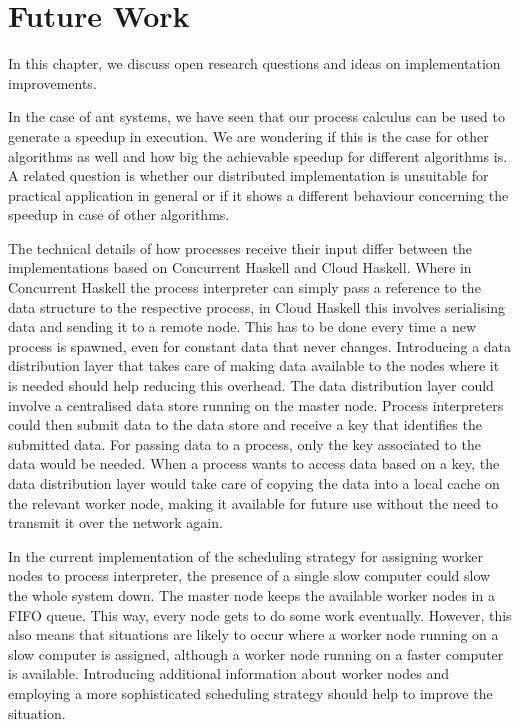 \chapter{Future Work}
In this chapter, we discuss open research questions and ideas on implementation improvements.

In the case of ant systems, we have seen that our process calculus can be used to generate a speedup in execution. We are wondering if this is the case for other algorithms as well and how big the achievable speedup for different algorithms is. A related question is whether our distributed implementation is unsuitable for practical application in general or if it shows a different behaviour concerning the speedup in case of other algorithms.

The technical details of how processes receive their input differ between the implementations based on \textsf{Concurrent Haskell} and \textsf{Cloud Haskell}. Where in \textsf{Concurrent Haskell} the process interpreter can simply pass a reference to the data structure to the respective process, in \textsf{Cloud Haskell} this involves serialising data and sending it to a remote node. This has to be done every time a new process is spawned, even for constant data that never changes. Introducing a data distribution layer that takes care of making data available to the nodes where it is needed should help reducing this overhead. The data distribution layer could involve a centralised data store running on the master node. Process interpreters could then submit data to the data store and receive a key that identifies the submitted data. For passing data to a process, only the key associated to the data would be needed. When a process wants to access data based on a key, the data distribution layer would take care of copying the data into a local cache on the relevant worker node, making it available for future use without the need to transmit it over the network again.

In the current implementation of the scheduling strategy for assigning worker nodes to process interpreter, the presence of a single slow computer could slow the whole system down. The master node keeps the available worker nodes in a FIFO queue. This way, every node gets to do some work eventually. However, this also means that situations are likely to occur where a worker node running on a slow computer is assigned, although a worker node running on a faster computer is available. Introducing additional information about worker nodes and employing a more sophisticated scheduling strategy should help to improve the situation.